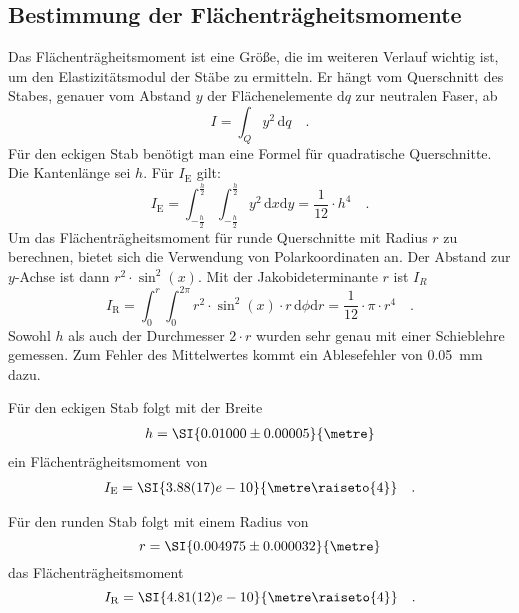\subsection{Bestimmung der Flächenträgheitsmomente}
Das Flächenträgheitsmoment ist eine Größe, die im weiteren Verlauf wichtig ist, um den Elastizitätsmodul der Stäbe zu ermitteln.
Er hängt vom Querschnitt des Stabes, genauer vom Abstand $y$ der Flächenelemente d$q$ zur neutralen Faser, ab
\begin{equation}
I = \int_{Q} y ^2 \, \text{d}q \quad .
\end{equation}
Für den eckigen Stab benötigt man eine Formel für quadratische Querschnitte. Die Kantenlänge sei $h$. Für $I_\text{E}$ gilt:
\begin{equation}
I_\text{E} = \int_{-\frac{h}{2}}^{\frac{h}{2}} \int_{-\frac{h}{2}}^{\frac{h}{2}} y^2\,  \text{d}x \text{d}y = \frac{1}{12} \cdot h^4 \quad .
\end{equation}
Um das Flächenträgheitsmoment für runde Querschnitte mit Radius $r$ zu berechnen, bietet sich die Verwendung von Polarkoordinaten an. Der Abstand zur $y$-Achse ist dann $r^2 \cdot \sin^2(x)$.  Mit der Jakobideterminante $r$ ist $I_R$
\begin{equation}
I_\text{R} = \int_{0}^{r}  \int_{0}^{2\pi} r^2 \cdot \sin^2(x) \cdot r  \, \text{d}\phi \text{d}r = \frac{1}{12}\cdot \pi \cdot r^4 \quad .
\end{equation}
Sowohl $h$ als auch der Durchmesser $2 \cdot r$ wurden sehr genau mit einer Schieblehre gemessen. Zum Fehler des Mittelwertes kommt ein Ablesefehler von \SI{0.05}{\milli\metre} dazu.



Für den eckigen Stab folgt mit der Breite
\begin{align}
  h = \SI{0.01000 \pm 0.00005}{\metre}
\end{align}
ein Flächenträgheitsmoment von
\begin{align}
I_\text{E}=\SI{3.88(17)e-10}{\metre\raiseto{4}} \quad .
\label{I_E}
\end{align}

Für den runden Stab folgt mit einem Radius von
\begin{equation}
  r = \SI{0.004975 \pm 0.000032}{\metre}
\end{equation}
das Flächenträgheitsmoment
\begin{equation}
  I_\text{R} = \SI{4.81(12)e-10}{\metre\raiseto{4}} \quad .
  \label{I_R}
\end{equation}


